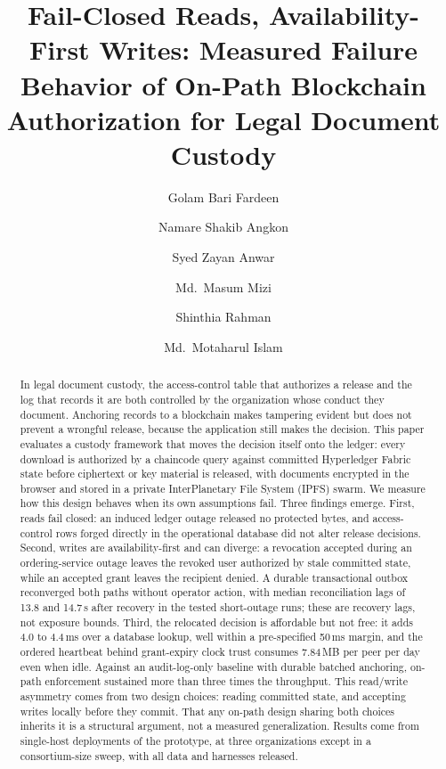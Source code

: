 \documentclass[preprint,12pt]{elsarticle}
\begin{document}
\begin{frontmatter}

\title{Fail-Closed Reads, Availability-First Writes: Measured Failure Behavior
of On-Path Blockchain Authorization for Legal Document Custody}

\author[uiu]{Golam Bari Fardeen}
\author[uiu]{Namare Shakib Angkon}
\author[uiu]{Syed Zayan Anwar}
\author[uiu]{Md.~Masum Mizi}
\author[uiu]{Shinthia Rahman}
\author[uiu]{Md.~Motaharul Islam}


\begin{abstract}
In legal document custody, the access-control table that authorizes a release
and the log that records it are both controlled by the organization whose
conduct they document. Anchoring records to a blockchain makes tampering
evident but does not prevent a wrongful release, because the application still
makes the decision. This paper evaluates a custody framework that moves the
decision itself onto the ledger: every download is authorized by a chaincode
query against committed Hyperledger Fabric state before ciphertext or key
material is released, with documents encrypted in the browser and stored in a
private InterPlanetary File System (IPFS) swarm. We measure how this design
behaves when its own
assumptions fail. Three findings emerge. First, reads fail closed: an induced
ledger outage released no protected bytes, and access-control rows forged
directly in the operational database did not alter release decisions. Second,
writes are availability-first and can diverge: a revocation accepted during an
ordering-service outage leaves the revoked user authorized by stale committed
state, while an accepted grant leaves the recipient denied. A durable
transactional outbox reconverged both paths without operator action, with
median reconciliation lags of 13.8 and 14.7\,s after recovery in the tested
short-outage runs; these are recovery lags, not exposure bounds. Third, the
relocated decision is affordable but not free: it adds 4.0 to 4.4\,ms over a
database lookup, well within a pre-specified 50\,ms margin, and the ordered
heartbeat behind grant-expiry clock trust consumes 7.84\,MB per peer per day
even when idle. Against an audit-log-only baseline with durable batched
anchoring, on-path enforcement sustained more than three times the
throughput. This read/write asymmetry comes from two design choices: reading
committed state, and accepting writes locally before they commit. That any
on-path design sharing both choices inherits it is a structural argument, not
a measured generalization. Results come from single-host deployments of the prototype,
at three organizations except in a consortium-size sweep, with all data and
harnesses released.
\end{abstract}


\end{frontmatter}
\end{document}
